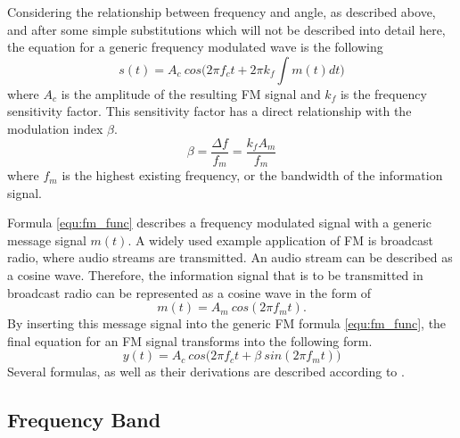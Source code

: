 Considering the relationship between frequency and angle, as described above, and after some simple substitutions which will not be described into detail here, the equation for a generic frequency modulated wave is the following
\begin{equation}
  s(t) = A_c\ cos \Big( 2 \pi f_c t + 2 \pi k_f \int m(t) dt \Big)
  \label{equ:fm_func}
\end{equation}
where $A_c$ is the amplitude of the resulting FM signal and $k_f$ is the frequency sensitivity factor.
This sensitivity factor has a direct relationship with the modulation index $\beta$.
\begin{equation}
  \beta = \frac{\Delta f}{f_m} = \frac{k_f A_m}{f_m}
\end{equation}
where $f_m$ is the highest existing frequency, or the bandwidth of the information signal.

Formula \eqref{equ:fm_func} describes a frequency modulated signal with a generic message signal $m(t)$.
A widely used example application of FM is broadcast radio, where audio streams are transmitted.
An audio stream can be described as a cosine wave.
Therefore, the information signal that is to be transmitted in broadcast radio can be represented as a cosine wave in the form of
\begin{equation}
  m(t) = A_m\ cos(2 \pi f_m t).
\end{equation}
By inserting this message signal into the generic FM formula \eqref{equ:fm_func}, the final equation for an FM signal transforms into the following form.
\begin{equation}
  y(t) = A_c\ cos \Big(2 \pi f_c t + \beta\ sin(2 \pi f_m t)\Big )
\end{equation}
Several formulas, as well as their derivations are described according to \cite[pg.54-55]{MatinMohammadA2018CSfE}.

\subsection{Frequency Band}

